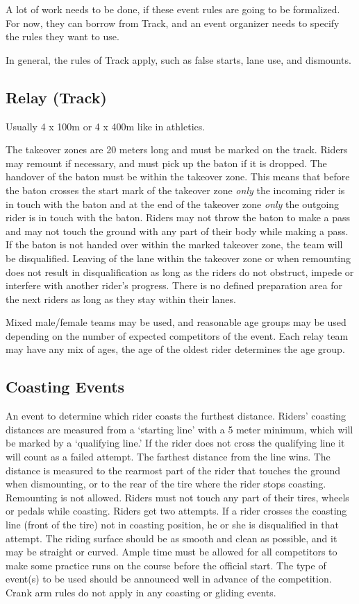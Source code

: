\begin{comment2016}
  A lot of work needs to be done, if these event rules are going to be formalized.
  For now, they can borrow from Track, and an event organizer needs to specify the rules they want to use.
\end{comment2016}

In general, the rules of Track apply, such as false starts, lane use, and dismounts.

\subsection{Relay (Track)}
Usually 4 x 100m or 4 x 400m like in athletics.

The takeover zones are 20 meters long and must be marked on the track.
Riders may remount if necessary, and must pick up the baton if it is dropped.
The handover of the baton must be within the takeover zone.
This means that before the baton crosses the start mark of the takeover zone \emph{only} the incoming rider is in touch with the baton and at the end of the takeover zone \emph{only} the outgoing rider is in touch with the baton.
Riders may not throw the baton to make a pass and may not touch the ground with any part of their body while making a pass.
If the baton is not handed over within the marked takeover zone, the team will be disqualified.
Leaving of the lane within the takeover zone or when remounting does not result in disqualification as long as the riders do not obstruct, impede or interfere with another rider's progress.
There is no defined preparation area for the next riders as long as they stay within their lanes.

Mixed male/female teams may be used, and reasonable age groups may be used depending on the number of expected competitors of the event.
Each relay team may have any mix of ages, the age of the oldest rider determines the age group.

\subsection{Coasting Events}
An event to determine which rider coasts the furthest distance.
Riders' coasting distances are measured from a `starting line' with a 5 meter minimum, which will be marked by a `qualifying line.'
If the rider does not cross the qualifying line it will count as a failed attempt.
The farthest distance from the line wins.
The distance is measured to the rearmost part of the rider that touches the ground when dismounting, or to the rear of the tire where the rider stops coasting.
Remounting is not allowed.
Riders must not touch any part of their tires, wheels or pedals while coasting.
Riders get two attempts.
If a rider crosses the coasting line (front of the tire) not in coasting position, he or she is disqualified in that attempt.
The riding surface should be as smooth and clean as possible, and it may be straight or curved.
Ample time must be allowed for all competitors to make some practice runs on the course before the official start.
The type of event(s) to be used should be announced well in advance of the competition.
Crank arm rules do not apply in any coasting or gliding events.

